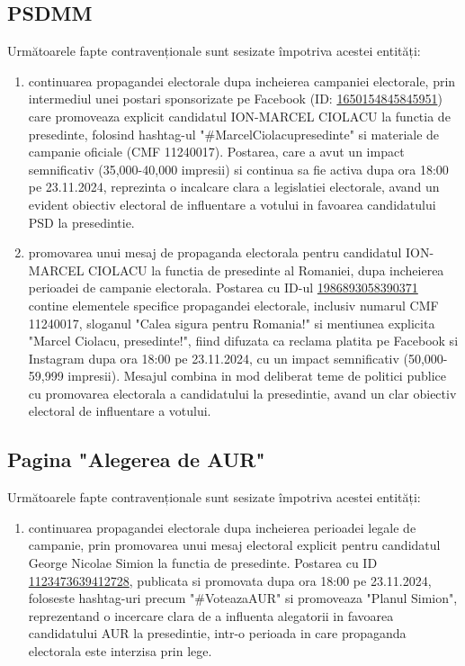 \documentclass[a4paper,12pt]{article}
\begin{document}
\vspace{0.5cm}

\subsection{PSDMM}
Următoarele fapte contravenționale sunt sesizate împotriva acestei entități:

\begin{enumerate}[leftmargin=*, label=\arabic*.)]
    \item continuarea propagandei electorale dupa incheierea campaniei electorale, prin intermediul unei postari sponsorizate pe Facebook (ID: \href{https://www.facebook.com/ads/library/?id=1650154845845951}{1650154845845951}) care promoveaza explicit candidatul ION-MARCEL CIOLACU la functia de presedinte, folosind hashtag-ul "\#MarcelCiolacupresedinte" si materiale de campanie oficiale (CMF 11240017). Postarea, care a avut un impact semnificativ (35,000-40,000 impresii) si continua sa fie activa dupa ora 18:00 pe 23.11.2024, reprezinta o incalcare clara a legislatiei electorale, avand un evident obiectiv electoral de influentare a votului in favoarea candidatului PSD la presedintie.
    \item promovarea unui mesaj de propaganda electorala pentru candidatul ION-MARCEL CIOLACU la functia de presedinte al Romaniei, dupa incheierea perioadei de campanie electorala. Postarea cu ID-ul \href{https://www.facebook.com/ads/library/?id=1986893058390371}{1986893058390371} contine elementele specifice propagandei electorale, inclusiv numarul CMF 11240017, sloganul "Calea sigura pentru Romania!" si mentiunea explicita "Marcel Ciolacu, presedinte!", fiind difuzata ca reclama platita pe Facebook si Instagram dupa ora 18:00 pe 23.11.2024, cu un impact semnificativ (50,000-59,999 impresii). Mesajul combina in mod deliberat teme de politici publice cu promovarea electorala a candidatului la presedintie, avand un clar obiectiv electoral de influentare a votului.
\end{enumerate}

\vspace{0.5cm}

\subsection{Pagina "Alegerea de AUR"}
Următoarele fapte contravenționale sunt sesizate împotriva acestei entități:

\begin{enumerate}[leftmargin=*, label=\arabic*.)]
    \item continuarea propagandei electorale dupa incheierea perioadei legale de campanie, prin promovarea unui mesaj electoral explicit pentru candidatul George Nicolae Simion la functia de presedinte. Postarea cu ID \href{https://www.facebook.com/ads/library/?id=1123473639412728}{1123473639412728}, publicata si promovata dupa ora 18:00 pe 23.11.2024, foloseste hashtag-uri precum "\#VoteazaAUR" si promoveaza "Planul Simion", reprezentand o incercare clara de a influenta alegatorii in favoarea candidatului AUR la presedintie, intr-o perioada in care propaganda electorala este interzisa prin lege.
\end{enumerate}
\end{document}
